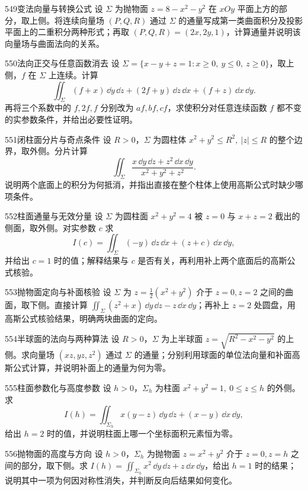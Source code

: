 \begin{exercise}{549}{变法向量与转换公式}
设 $\Sigma$ 为抛物面 $z=8-x^2-y^2$ 在 $xOy$ 平面上方的部分，取上侧。将连续向量场 $(P,Q,R)$ 通过 $\Sigma$ 的通量写成第一类曲面积分及投影平面上的二重积分两种形式；再取 $(P,Q,R)=(2x,2y,1)$，计算通量并说明该向量场与曲面法向的关系。
\end{exercise}
\begin{exercise}{550}{法向正交与任意函数消去}
设 $\Sigma=\{x-y+z=1:x\ge0,\ y\le0,\ z\ge0\}$，取上侧，$f$ 在 $\Sigma$ 上连续。计算
\[\iint_{\Sigma}(f+x)\,\dd y\,\dd z+(2f+y)\,\dd z\,\dd x+(f+z)\,\dd x\,\dd y.\]
再将三个系数中的 $f,2f,f$ 分别改为 $af,bf,cf$，求使积分对任意连续函数 $f$ 都不变的实参数条件，并给出必要性证明。
\end{exercise}
\begin{exercise}{551}{闭柱面分片与奇点条件}
设 $R>0$，$\Sigma$ 为圆柱体 $x^2+y^2\le R^2,\ |z|\le R$ 的整个边界，取外侧。分片计算
\[\iint_{\Sigma}\frac{x\,\dd y\,\dd z+z^2\,\dd x\,\dd y}{x^2+y^2+z^2}.\]
说明两个底面上的积分为何抵消，并指出直接在整个柱体上使用高斯公式时缺少哪项条件。
\end{exercise}
\begin{exercise}{552}{柱面通量与无效分量}
设 $\Sigma$ 为圆柱面 $x^2+y^2=4$ 被 $z=0$ 与 $x+z=2$ 截出的侧面，取外侧。对实参数 $c$ 求
\[I(c)=\iint_{\Sigma}(-y)\,\dd z\,\dd x+(z+c)\,\dd x\,\dd y,\]
并给出 $c=1$ 时的值；解释结果与 $c$ 是否有关，再利用补上两个底面后的高斯公式核验。
\end{exercise}
\begin{exercise}{553}{抛物面定向与补面核验}
设 $\Sigma$ 为 $z=\frac12(x^2+y^2)$ 介于 $z=0,z=2$ 之间的曲面，取下侧。直接计算 $\iint_{\Sigma}(z^2+x)\,\dd y\,\dd z-z\,\dd x\,\dd y$；再补上 $z=2$ 处圆盘，用高斯公式核验结果，明确两块曲面的定向。
\end{exercise}
\begin{exercise}{554}{半球面的法向与两种算法}
设 $R>0$，$\Sigma$ 为上半球面 $z=\sqrt{R^2-x^2-y^2}$ 的上侧。求向量场 $(xz,yz,z^2)$ 通过 $\Sigma$ 的通量；分别利用球面的单位法向量和补面高斯公式计算，并说明补面上的通量为何为零。
\end{exercise}
\begin{exercise}{555}{柱面参数化与高度参数}
设 $h>0$，$\Sigma_h$ 为柱面 $x^2+y^2=1,\ 0\le z\le h$ 的外侧。求
\[I(h)=\iint_{\Sigma_h}x(y-z)\,\dd y\,\dd z+(x-y)\,\dd x\,\dd y,\]
给出 $h=2$ 时的值，并说明柱面上哪一个坐标面积元素恒为零。
\end{exercise}
\begin{exercise}{556}{抛物面的高度与方向}
设 $h>0$，$\Sigma_h$ 为抛物面 $z=x^2+y^2$ 介于 $z=0,z=h$ 之间的部分，取下侧。求 $I(h)=\iint_{\Sigma_h}x^2\,\dd y\,\dd z+z\,\dd x\,\dd y$，给出 $h=1$ 时的结果；说明其中一项为何因对称性消失，并判断反向后结果如何变化。
\end{exercise}
